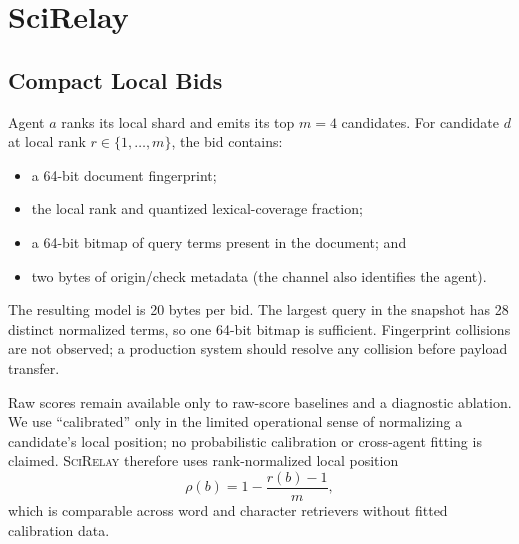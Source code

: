 \documentclass[sigconf]{acmart}
\newcommand{\method}{\textsc{SciRelay}}
\begin{document}
\section{SciRelay}

\subsection{Compact Local Bids}

Agent $a$ ranks its local shard and emits its top $m=4$ candidates. For candidate $d$ at local rank $r\in\{1,\ldots,m\}$, the bid contains:
\begin{itemize}
  \item a 64-bit document fingerprint;
  \item the local rank and quantized lexical-coverage fraction;
  \item a 64-bit bitmap of query terms present in the document; and
  \item two bytes of origin/check metadata (the channel also identifies the agent).
\end{itemize}
The resulting model is 20 bytes per bid. The largest query in the snapshot has 28 distinct normalized terms, so one 64-bit bitmap is sufficient. Fingerprint collisions are not observed; a production system should resolve any collision before payload transfer.

Raw scores remain available only to raw-score baselines and a diagnostic ablation. We use ``calibrated'' only in the limited operational sense of normalizing a candidate's local position; no probabilistic calibration or cross-agent fitting is claimed. \method{} therefore uses rank-normalized local position
\begin{equation}
 \rho(b)=1-\frac{r(b)-1}{m},
\end{equation}
which is comparable across word and character retrievers without fitted calibration data.
\end{document}
